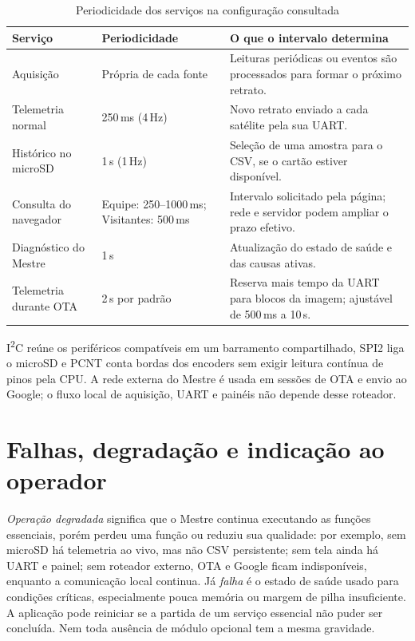 \begin{table}[htbp]\centering\small
\caption{Periodicidade dos serviços na configuração consultada}\label{tab:ritmos}
\begin{tabularx}{\textwidth}{@{}p{3.3cm}p{3.2cm}X@{}}\toprule
Serviço & Periodicidade & O que o intervalo determina\\\midrule
Aquisição & Própria de cada fonte & Leituras periódicas ou eventos são processados para formar o próximo retrato.\\
Telemetria normal & 250\,ms (4\,Hz) & Novo retrato enviado a cada satélite pela sua UART.\\
Histórico no microSD & 1\,s (1\,Hz) & Seleção de uma amostra para o CSV, se o cartão estiver disponível.\\
Consulta do navegador & Equipe: 250--1000\,ms; Visitantes: 500\,ms & Intervalo solicitado pela página; rede e servidor podem ampliar o prazo efetivo.\\
Diagnóstico do Mestre & 1\,s & Atualização do estado de saúde e das causas ativas.\\
Telemetria durante OTA & 2\,s por padrão & Reserva mais tempo da UART para blocos da imagem; ajustável de 500\,ms a 10\,s.\\\bottomrule
\end{tabularx}\end{table}

I\textsuperscript{2}C reúne os periféricos compatíveis em um barramento compartilhado, SPI2 liga o microSD e PCNT conta bordas dos encoders sem exigir leitura contínua de pinos pela CPU. A rede externa do Mestre é usada em sessões de OTA e envio ao Google; o fluxo local de aquisição, UART e painéis não depende desse roteador.

\section{Falhas, degradação e indicação ao operador}
\emph{Operação degradada} significa que o Mestre continua executando as funções essenciais, porém perdeu uma função ou reduziu sua qualidade: por exemplo, sem microSD há telemetria ao vivo, mas não CSV persistente; sem tela ainda há UART e painel; sem roteador externo, OTA e Google ficam indisponíveis, enquanto a comunicação local continua. Já \emph{falha} é o estado de saúde usado para condições críticas, especialmente pouca memória ou margem de pilha insuficiente. A aplicação pode reiniciar se a partida de um serviço essencial não puder ser concluída. Nem toda ausência de módulo opcional tem a mesma gravidade.

